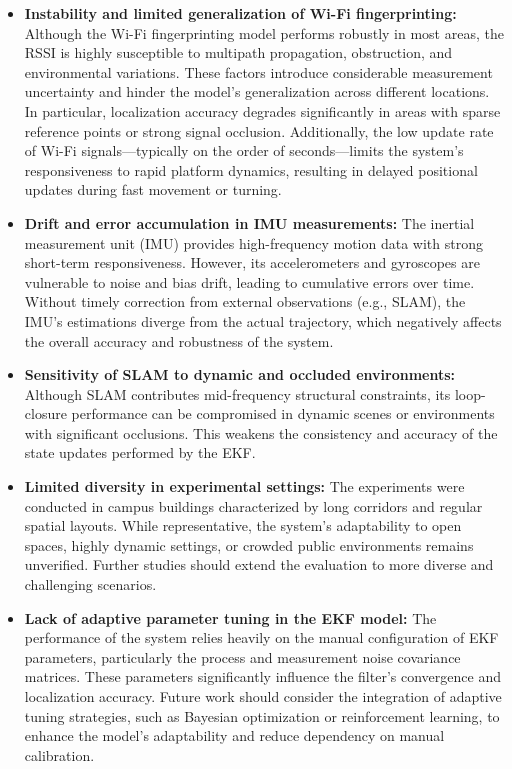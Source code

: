 \documentclass[12pt,a4paper]{article}
\numberwithin{equation}{section}
\begin{document}
\begin{itemize}
    \item \textbf{Instability and limited generalization of Wi-Fi fingerprinting:} Although the Wi-Fi fingerprinting model performs robustly in most areas, the RSSI is highly susceptible to multipath propagation, obstruction, and environmental variations. These factors introduce considerable measurement uncertainty and hinder the model’s generalization across different locations. In particular, localization accuracy degrades significantly in areas with sparse reference points or strong signal occlusion. Additionally, the low update rate of Wi-Fi signals—typically on the order of seconds—limits the system’s responsiveness to rapid platform dynamics, resulting in delayed positional updates during fast movement or turning.

    \item \textbf{Drift and error accumulation in IMU measurements:} The inertial measurement unit (IMU) provides high-frequency motion data with strong short-term responsiveness. However, its accelerometers and gyroscopes are vulnerable to noise and bias drift, leading to cumulative errors over time. Without timely correction from external observations (e.g., SLAM), the IMU’s estimations diverge from the actual trajectory, which negatively affects the overall accuracy and robustness of the system.

    \item \textbf{Sensitivity of SLAM to dynamic and occluded environments:} Although SLAM contributes mid-frequency structural constraints, its loop-closure performance can be compromised in dynamic scenes or environments with significant occlusions. This weakens the consistency and accuracy of the state updates performed by the EKF.

    \item \textbf{Limited diversity in experimental settings:} The experiments were conducted in campus buildings characterized by long corridors and regular spatial layouts. While representative, the system’s adaptability to open spaces, highly dynamic settings, or crowded public environments remains unverified. Further studies should extend the evaluation to more diverse and challenging scenarios.

    \item \textbf{Lack of adaptive parameter tuning in the EKF model:} The performance of the system relies heavily on the manual configuration of EKF parameters, particularly the process and measurement noise covariance matrices. These parameters significantly influence the filter’s convergence and localization accuracy. Future work should consider the integration of adaptive tuning strategies, such as Bayesian optimization or reinforcement learning, to enhance the model’s adaptability and reduce dependency on manual calibration.
\end{itemize}
\end{document}
